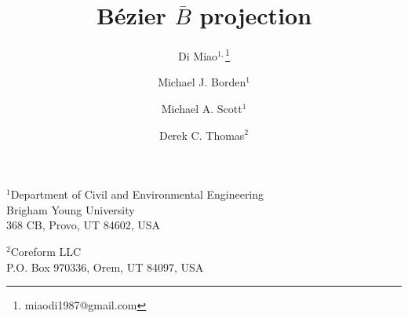 \documentclass{article}
\title{B\'{e}zier $\bar{B}$ projection}
\author{Di Miao$^{1,}$\thanks{miaodi1987@gmail.com} \and Michael J. Borden$^1$ \and Michael A. Scott$^1$ \and Derek C. Thomas$^2$}
\date{}
\newcommand{\Bezier}{{B\'{e}zier} }
\begin{document}
\maketitle
\vspace{-2em}
%
\begin{center}

$^1$Department of Civil and Environmental Engineering\\
Brigham Young University\\
368 CB, Provo, UT 84602, USA\\ \vspace{1em}
 
$^2$Coreform LLC\\
P.O. Box 970336, Orem, UT 84097, USA \\ 
\end{center}

\end{document}
